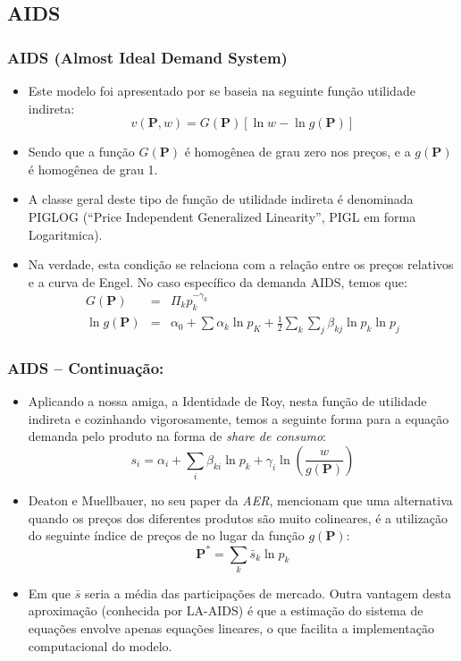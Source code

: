\documentclass{beamer}
\begin{document}
\subsection{AIDS}

\begin{frame}\frametitle{AIDS (Almost Ideal Demand System)}

\begin{itemize}
\item Este modelo foi apresentado por \citet{Deaton1980} se baseia na seguinte função utilidade indireta:
\[
v(\mathbf{P},w)=G(\mathbf{P})[\ln w-\ln g(\mathbf{P})]
\]
\item Sendo que a função $G(\mathbf{P})$ é homogênea de grau zero nos preços,
e a $g(\mathbf{P})$ é homogênea de grau 1. 
\item A classe geral deste tipo de função de utilidade indireta é denominada
PIGLOG (``Price Independent Generalized Linearity'', PIGL em forma
Logaritmica). 
\item Na verdade, esta condição se relaciona com a relação entre os preços
relativos e a curva de Engel. No caso específico da demanda AIDS,
temos que:
\begin{eqnarray*}
G(\mathbf{P}) & = & \Pi_{k}p_{k}^{-\gamma_{k}}\\
\ln g(\mathbf{P}) & = & \alpha_{0}+\sum\alpha_{k}\ln p_{K}+\frac{1}{2}\sum_{k}\sum_{j}\beta_{kj}\ln p_{k}\ln p_{j}
\end{eqnarray*}
\end{itemize}
\end{frame}

\begin{frame}\frametitle{AIDS -- Continuação:}
\small
\begin{itemize}
\item Aplicando a nossa amiga, a Identidade de Roy, nesta função de utilidade
indireta e cozinhando vigorosamente, temos a seguinte forma para a
equação demanda pelo produto na forma de \emph{share de consumo}:
\[
s_{i}=\alpha_{i}+\sum_{i}\beta_{ki}\ln p_{k}+\gamma_{i}\ln\left(\frac{w}{g(\mathbf{P})}\right)
\]
\item Deaton e Muellbauer, no seu paper da \emph{AER}, mencionam que uma
alternativa quando os preços dos diferentes produtos são muito colineares,
é a utilização do seguinte índice de preços de \citet{stone1954measurement} no lugar
da função $g(\mathbf{P})$:
\[
\mathbf{P}^{*}=\sum_{k}\bar{s}_{k}\ln p_{k}
\]
\item Em que $\bar{s}$ seria a média das participações de
mercado. Outra vantagem desta aproximação (conhecida por LA-AIDS)
é que a estimação do sistema de equações envolve apenas equações lineares,
o que facilita a implementação computacional do modelo. 
\end{itemize}
\end{frame}
\end{document}

